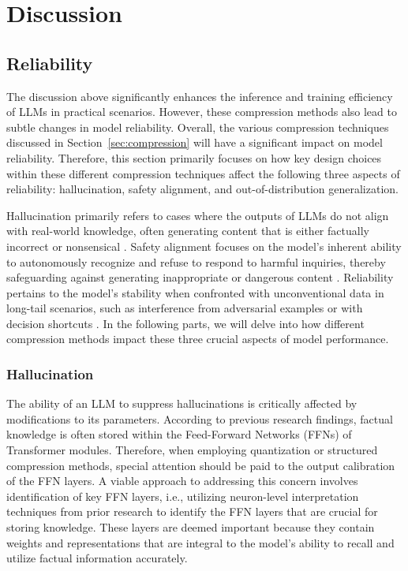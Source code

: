 \section{Discussion}

\subsection{Reliability}

The discussion above significantly enhances the inference and training efficiency of LLMs in practical scenarios. However, these compression methods also lead to subtle changes in model reliability. Overall, the various compression techniques discussed in Section~\ref{sec:compression} will have a significant impact on model reliability. Therefore, this section primarily focuses on how key design choices within these different compression techniques affect  the following three aspects of reliability: hallucination, safety alignment, and out-of-distribution generalization.

Hallucination primarily refers to cases where the outputs of LLMs do not align with real-world knowledge, often generating content that is either factually incorrect or nonsensical \cite{huang2023survey}. Safety alignment focuses on the model's inherent ability to autonomously recognize and refuse to respond to harmful inquiries, thereby safeguarding against generating inappropriate or dangerous content \cite{ouyang2022training}. Reliability pertains to the model's stability when confronted with unconventional data in long-tail scenarios, such as interference from adversarial examples or with decision shortcuts \cite{geirhos2020shortcut}. In the following parts, we will delve into how different compression methods impact these three crucial aspects of model performance.

\subsubsection{Hallucination}
The ability of an LLM to suppress hallucinations is critically affected by modifications to its parameters. According to previous research findings, factual knowledge is often stored within the Feed-Forward Networks (FFNs) of Transformer modules. Therefore, when employing quantization or structured compression methods, special attention should be paid to the output calibration of the FFN layers. A viable approach to addressing this concern involves identification of key FFN layers, i.e., utilizing neuron-level interpretation techniques from prior research \cite{DBLP:conf/nips/MengBAB22} to identify the FFN layers that are crucial for storing knowledge. These layers are deemed important because they contain weights and representations that are integral to the model's ability to recall and utilize factual information accurately. 

